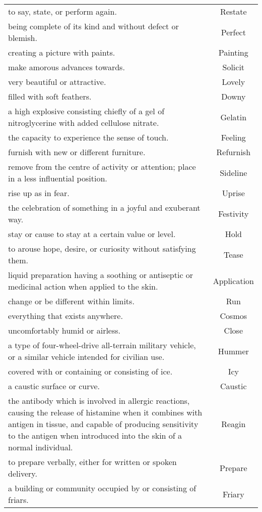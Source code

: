 \documentclass{article}
\begin{document}
\begin{longtable}{p{12cm}c}
to say, state, or perform again. & Restate\\
being complete of its kind and without defect or blemish. & Perfect\\
creating a picture with paints. & Painting\\
make amorous advances towards. & Solicit\\
very beautiful or attractive. & Lovely\\
filled with soft feathers. & Downy\\
a high explosive consisting chiefly of a gel of nitroglycerine with added cellulose nitrate. & Gelatin\\
the capacity to experience the sense of touch. & Feeling\\
furnish with new or different furniture. & Refurnish\\
remove from the centre of activity or attention; place in a less influential position. & Sideline\\
rise up as in fear. & Uprise\\
the celebration of something in a joyful and exuberant way. & Festivity\\
stay or cause to stay at a certain value or level. & Hold\\
to arouse hope, desire, or curiosity without satisfying them. & Tease\\
liquid preparation having a soothing or antiseptic or medicinal action when applied to the skin. & Application\\
change or be different within limits. & Run\\
everything that exists anywhere. & Cosmos\\
uncomfortably humid or airless. & Close\\
a type of four-wheel-drive all-terrain military vehicle, or a similar vehicle intended for civilian use. & Hummer\\
covered with or containing or consisting of ice. & Icy\\
a caustic surface or curve. & Caustic\\
the antibody which is involved in allergic reactions, causing the release of histamine when it combines with antigen in tissue, and capable of producing sensitivity to the antigen when introduced into the skin of a normal individual. & Reagin\\
to prepare verbally, either for written or spoken delivery. & Prepare\\
a building or community occupied by or consisting of friars. & Friary\\

\end{longtable}
\end{document}
